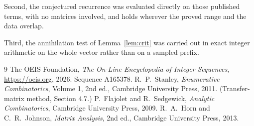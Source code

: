 \documentclass[11pt,a4paper]{article}
\theoremstyle{plain}
\theoremstyle{definition}
\begin{document}
Second, the conjectured recurrence was evaluated directly on those published terms, with no
matrices involved, and holds wherever the proved range and the data overlap.

Third, the annihilation test of Lemma~\ref{lem:crit} was carried out in exact integer
arithmetic on the whole vector rather than on a sampled prefix.

\begin{thebibliography}{9}
 The OEIS Foundation, \emph{The On-Line Encyclopedia of Integer
Sequences}, \url{https://oeis.org}, 2026. Sequence A165378.
 R.~P.~Stanley, \emph{Enumerative Combinatorics}, Volume 1, 2nd ed.,
Cambridge University Press, 2011. (Transfer-matrix method, Section 4.7.)
 P.~Flajolet and R.~Sedgewick, \emph{Analytic Combinatorics}, Cambridge
University Press, 2009.
 R.~A.~Horn and C.~R.~Johnson, \emph{Matrix Analysis}, 2nd ed., Cambridge
University Press, 2013.
\end{thebibliography}
\end{document}
